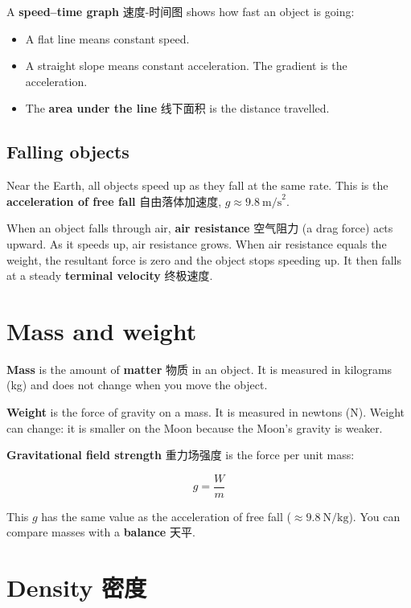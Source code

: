 \documentclass[11pt]{article}
\begin{document}
A \textbf{speed–time graph} 速度-时间图 shows how fast an object is going:

\begin{itemize}
\item A flat line means constant speed.

\item A straight slope means constant acceleration. The gradient is the acceleration.

\item The \textbf{area under the line} 线下面积 is the distance travelled.

\end{itemize}

\subsection*{Falling objects}

Near the Earth, all objects speed up as they fall at the same rate. This is the \textbf{acceleration of free fall} 自由落体加速度, $g \approx 9.8\ \text{m/s}^2$.

When an object falls through air, \textbf{air resistance} 空气阻力 (a drag force) acts upward. As it speeds up, air resistance grows. When air resistance equals the weight, the resultant force is zero and the object stops speeding up. It then falls at a steady \textbf{terminal velocity} 终极速度.

\section*{Mass and weight}

\textbf{Mass} is the amount of \textbf{matter} 物质 in an object. It is measured in kilograms (kg) and does not change when you move the object.

\textbf{Weight} is the force of gravity on a mass. It is measured in newtons (N). Weight can change: it is smaller on the Moon because the Moon's gravity is weaker.

\textbf{Gravitational field strength} 重力场强度 is the force per unit mass:

\[
g = \frac{W}{m}
\]

This $g$ has the same value as the acceleration of free fall ($\approx 9.8\ \text{N/kg}$). You can compare masses with a \textbf{balance} 天平.

\section*{Density 密度}
\end{document}
